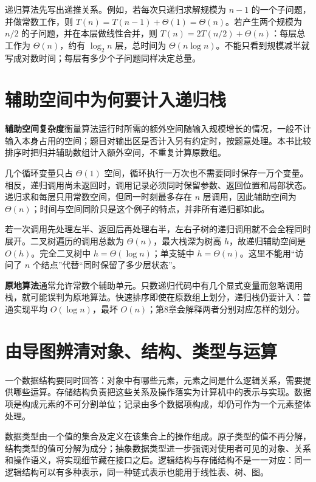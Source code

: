 递归算法先写出递推关系。例如，若每次只递归求解规模为 \(n-1\) 的一个子问题，并做常数工作，则 \(T(n)=T(n-1)+\Theta(1)=\Theta(n)\)。若产生两个规模为 \(n/2\) 的子问题，并在本层做线性合并，则 \(T(n)=2T(n/2)+\Theta(n)\)：每层总工作为 \(\Theta(n)\)，约有 \(\log_2n\) 层，总时间为 \(\Theta(n\log n)\)。不能只看到规模减半就写成对数时间；每层有多少个子问题同样决定总量。

\section{辅助空间中为何要计入递归栈}\label{DS01-04}

\textbf{辅助空间复杂度}衡量算法运行时所需的额外空间随输入规模增长的情况，一般不计输入本身占用的空间；题目对输出区是否计入另有约定时，按题意处理。本书比较排序时把归并辅助数组计入额外空间，不重复计算原数组。

几个循环变量只占 \(\Theta(1)\) 空间，循环执行一万次也不需要同时保存一万个变量。相反，递归调用尚未返回时，调用记录必须同时保留参数、返回位置和局部状态。递归求和每层只用常数空间，但同一时刻最多存在 \(n\) 层调用，因此辅助空间为 \(\Theta(n)\)；时间与空间同阶只是这个例子的特点，并非所有递归都如此。

若一次调用先处理左半、返回后再处理右半，左右子树的递归调用就不会全程同时展开。二叉树遍历的调用总数为 \(\Theta(n)\)，最大栈深为树高 \(h\)，故递归辅助空间是 \(O(h)\)。完全二叉树中 \(h=\Theta(\log n)\)；单支链中 \(h=\Theta(n)\)。这里不能用``访问了 \(n\) 个结点''代替``同时保留了多少层状态''。

\textbf{原地算法}通常允许常数个辅助单元。只数递归代码中有几个显式变量而忽略调用栈，就可能误判为原地算法。快速排序即使在原数组上划分，递归栈仍要计入：普通实现平均 \(O(\log n)\)，最坏 \(O(n)\)；第8章会解释两者分别对应怎样的划分。

\section{由导图辨清对象、结构、类型与运算}\label{DS01-map}

\begin{definition}[数据结构的三要素]

一个数据结构要同时回答：对象中有哪些元素，元素之间是什么逻辑关系，需要提供哪些运算。存储结构负责把这些关系及操作落实为计算机中的表示与实现。数据项是构成元素的不可分割单位；记录由多个数据项构成，却仍可作为一个元素整体处理。

\end{definition}

数据类型由一个值的集合及定义在该集合上的操作组成。原子类型的值不再分解，结构类型的值可分解为成分；抽象数据类型进一步强调对使用者可见的对象、关系和操作语义，将实现细节藏在接口之后。逻辑结构与存储结构不是一一对应：同一逻辑结构可以有多种表示，同一种链式表示也能用于线性表、树、图。

